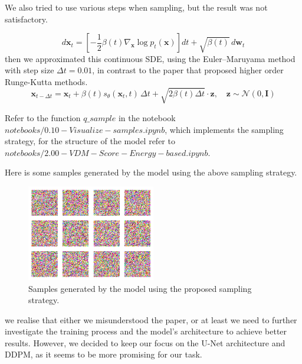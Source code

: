 \documentclass[twocolumn,superscriptaddress,aps]{revtex4-1}
\begin{document}
We also tried to use various steps when sampling, but the result was not satisfactory.

$$
    d\mathbf{x}_t = \left[ -\frac{1}{2} \beta(t) \nabla_{\mathbf{x}} \log p_t(\mathbf{x}) \right] dt + \sqrt{\beta(t)}\, d\mathbf{w}_t
$$
then we approximated this continuous SDE, using the Euler–Maruyama method with step size $\Delta t = 0.01$, in contrast to the paper that proposed higher order Runge-Kutta methods.
$$
    \mathbf{x}_{t - \Delta t} = \mathbf{x}_t + \beta(t) s_\theta(\mathbf{x}_t, t)\, \Delta t + \sqrt{2 \beta(t) \Delta t} \cdot \mathbf{z}, \quad \mathbf{z} \sim \mathcal{N}(0, \mathbf{I})
$$

Refer to the function $q\_sample$ in the notebook $notebooks/0.10-Visualize-samples.ipynb$, which implements the sampling strategy, for the structure of the model refer to $notebooks/2.00-VDM-Score-Energy-based.ipynb$.

\newpage
Here is some samples generated by the model using the above sampling strategy.
\begin{figure}
    \centering
    \includegraphics[width=0.5\textwidth]{figures/score-based-sampling.png}
    \caption{Samples generated by the model using the proposed sampling strategy.}
    \label{fig:sample_generated}
\end{figure}

we realise that either we misunderstood the paper, or at least we need to further investigate the training process and the model's architecture to achieve better results. However, we decided to keep our focus on the U-Net architecture and DDPM, as it seems to be more promising for our task.

\newpage
\end{document}
